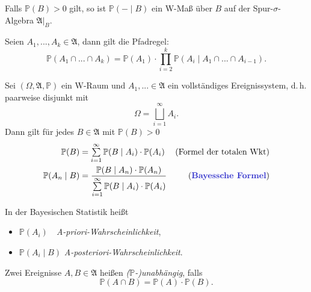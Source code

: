\documentclass{cheat-sheet}
\newcommand{\Alg}{\mathfrak{A}} %
\renewcommand{\P}{\mathbb{P}}
\begin{document}
\begin{bem}
  Falls $\P(B) > 0$ gilt, so ist $\P(- \mid B)$ ein W-Maß über $B$ auf der Spur-$\sigma$-Algebra $\Alg|_B$.
\end{bem}

\begin{lem}
  Seien $A_1, ..., A_k \in \Alg$, dann gilt die Pfadregel:
  \[ \P(A_1 \cap ... \cap A_k) = \P(A_1) \cdot \prod_{i=2}^k \P(A_i \mid A_1 \cap ... \cap A_{i-1}). \]
\end{lem}





\begin{satz}
  Sei $(\Omega, \Alg, \P)$ ein W-Raum und $A_1, ... \in \Alg$ ein vollständiges Ereignissystem, d.\,h. paarweise disjunkt mit
  \[ \Omega = \bigsqcup_{i = 1}^\infty A_i. \]
  Dann gilt für jedes $B \in \Alg$ mit $\P(B) > 0$
  \begin{align*}
    \P(B) &= \sum_{i=1}^{\infty} \P(B \mid A_i) \cdot \P(A_i) & \text{(Formel der totalen Wkt)} \\
    \P(A_n \mid B) &= \frac{\P(B \mid A_n) \cdot \P(A_n)}{\sum_{i=1}^\infty \P(B \mid A_i) \cdot \P(A_i)} & \text{(\emph{Bayessche Formel})}
  \end{align*}
\end{satz}


\begin{sprech}
  In der Bayesischen Statistik heißt
  \begin{itemize}
    \item $\P(A_i)$ \quad \,\, \emph{A-priori-Wahrscheinlichkeit},
    \item $\P(A_i \mid B)$ \emph{A-posteriori-Wahrscheinlichkeit}.
  \end{itemize}
\end{sprech}



\begin{defn}
  Zwei Ereignisse $A, B \in \Alg$ heißen \emph{($\P$-)unabhängig}, falls
  \[ \P(A \cap B) = \P(A) \cdot \P(B). \]
\end{defn}
\end{document}
